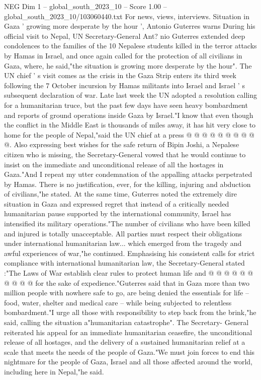 \begin{textsample}{NEG Dim 1 – global\_south\_2023\_10 – Score 1.00 – global\_south\_2023\_10/103060440.txt}  \label{ex:f1_neg_400}
For news, views, interviews.
Situation in Gaza ' growing more desperate by the hour ', Antonio Guterres warns During his official visit to Nepal, UN Secretary-General Ant? nio Guterres extended deep condolences to the families of the 10 Nepalese students killed in the terror attacks by Hamas in Israel, and once again called for the protection of all civilians in Gaza, where, he said,"the situation is growing more desperate by the hour".
The UN chief ' s visit comes as the crisis in the Gaza Strip enters its third week following the 7 October incursion by Hamas militants into Israel and Israel ' s subsequent declaration of war.
Late last week the UN adopted a resolution calling for a humanitarian truce, but the past few days have seen heavy bombardment and reports of ground operations inside Gaza by Israel."I know that even though the conflict in the Middle East is thousands of miles away, it has hit very close to home for the people of Nepal,"said the UN chief at a press @ @ @ @ @ @ @ @ @ @.
Also expressing best wishes for the safe return of Bipin Joshi, a Nepalese citizen who is missing, the Secretary-General vowed that he would continue to insist on the immediate and unconditional release of all the hostages in Gaza."And I repeat my utter condemnation of the appalling attacks perpetrated by Hamas.
There is no justification, ever, for the killing, injuring and abduction of civilians,"he stated.
At the same time, Guterres noted the extremely dire situation in Gaza and expressed regret that instead of a critically needed humanitarian pause supported by the international community, Israel has intensified its military operations."The number of civilians who have been killed and injured is totally unacceptable.
All parties must respect their obligations under international humanitarian law... which emerged from the tragedy and awful experiences of war,"he continued.
Emphasising his consistent calls for strict compliance with international humanitarian law, the Secretary-General stated :"The Laws of War establish clear rules to protect human life and @ @ @ @ @ @ @ @ @ @ for the sake of expedience."Guterres said that in Gaza more than two million people with nowhere safe to go, are being denied the essentials for life -- food, water, shelter and medical care -- while being subjected to relentless bombardment."I urge all those with responsibility to step back from the brink,"he said, calling the situation a"humanitarian catastrophe".
The Secretary- General reiterated his appeal for an immediate humanitarian ceasefire, the unconditional release of all hostages, and the delivery of a sustained humanitarian relief at a scale that meets the needs of the people of Gaza."We must join forces to end this nightmare for the people of Gaza, Israel and all those affected around the world, including here in Nepal,"he said.

\end{textsample}
